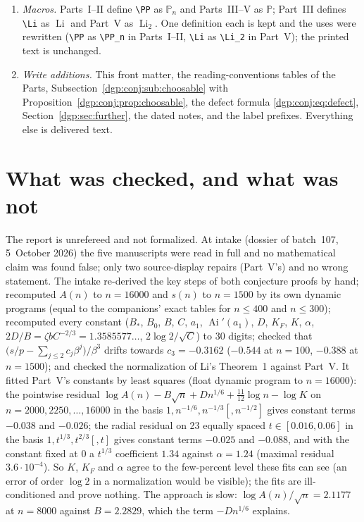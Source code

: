\documentclass[11pt,letterpaper]{article}
\numberwithin{equation}{section}
\theoremstyle{remark}\newtheorem{remark}[theorem]{Remark}
\newcommand{\PP}{\mathbb P}
\DeclareMathOperator{\Li}{Li}
\begin{document}
\begin{enumerate}
\item \emph{Macros.} Parts~I--II define \verb!\PP! as $\mathbb P_n$ and Parts~III--V as $\mathbb P$; Part~III defines \verb!\Li! as $\operatorname{Li}$ and Part~V as $\operatorname{Li}_2$. One definition each is kept and the uses were rewritten (\verb!\PP! as \verb!\PP_n! in Parts~I--II, \verb!\Li! as \verb!\Li_2! in Part~V); the printed text is unchanged.
\item \emph{Write additions.} This front matter, the reading-conventions tables of the Parts, Subsection~\ref{dgp:conj:sub:choosable} with Proposition~\ref{dgp:conj:prop:choosable}, the defect formula \eqref{dgp:conj:eq:defect}, Section~\ref{dgp:sec:further}, the dated notes, and the label prefixes. Everything else is delivered text.
\end{enumerate}

\section*{What was checked, and what was not}\label{dgp:sec:trust}
The report is unrefereed and not formalized. At intake (dossier of batch~107, 5~October 2026) the five manuscripts were read in full and no mathematical claim was found false; only two source-display repairs (Part~V's) and no wrong statement. The intake re-derived the key steps of both conjecture proofs by hand; recomputed $A(n)$ to $n=16000$ and $s(n)$ to $n=1500$ by its own dynamic programs (equal to the companions' exact tables for $n\le400$ and $n\le300$); recomputed every constant ($B_*$, $B_0$, $B$, $C$, $a_1$, $\operatorname{Ai}'(a_1)$, $D$, $K_F$, $K$, $\alpha$, $2D/B=\zeta bC^{-2/3}=1.3585577\ldots$, $2\log2/\sqrt C$) to 30 digits; checked that $\bigl(s/p-\sum_{j\le2}c_j\beta^j\bigr)/\beta^3$ drifts towards $c_3=-0.3162$ ($-0.544$ at $n=100$, $-0.388$ at $n=1500$); and checked the normalization of Li's Theorem~1 against Part~V. It fitted Part~V's constants by least squares (float dynamic program to $n=16000$): the pointwise residual $\log A(n)-B\sqrt n+Dn^{1/6}+\frac{11}{12}\log n-\log K$ on $n=2000,2250,\dots,16000$ in the basis $1,n^{-1/6},n^{-1/3}[,n^{-1/2}]$ gives constant terms $-0.038$ and $-0.026$; the radial residual on 23 equally spaced $t\in[0.016,0.06]$ in the basis $1,t^{1/3},t^{2/3}[,t]$ gives constant terms $-0.025$ and $-0.088$, and with the constant fixed at $0$ a $t^{1/3}$ coefficient $1.34$ against $\alpha=1.24$ (maximal residual $3.6\cdot10^{-4}$). So $K$, $K_F$ and $\alpha$ agree to the few-percent level these fits can see (an error of order $\log2$ in a normalization would be visible); the fits are ill-conditioned and prove nothing. The approach is slow: $\log A(n)/\sqrt n=2.1177$ at $n=8000$ against $B=2.2829$, which the term $-Dn^{1/6}$ explains.
\end{document}
